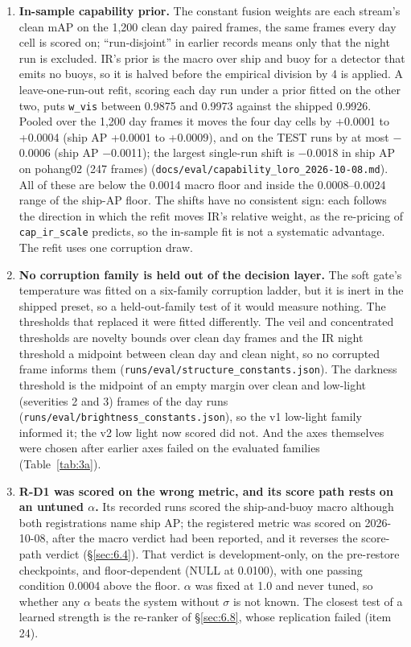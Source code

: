\documentclass[10pt]{article}
\begin{document}
\begin{enumerate}
\item \textbf{In-sample capability prior.} The constant fusion weights are each stream's clean mAP on the 1,200 clean day paired frames, the same frames every day cell is scored on; ``run-disjoint'' in earlier records means only that the night run is excluded. IR's prior is the macro over ship and buoy for a detector that emits no buoys, so it is halved before the empirical division by 4 is applied. A leave-one-run-out refit, scoring each day run under a prior fitted on the other two, puts \texttt{w\_\allowbreak{}vis} between 0.9875 and 0.9973 against the shipped 0.9926. Pooled over the 1,200 day frames it moves the four day cells by +0.0001 to +0.0004 (ship AP +0.0001 to +0.0009), and on the TEST runs by at most $-$0.0006 (ship AP $-$0.0011); the largest single-run shift is $-$0.0018 in ship AP on pohang02 (247 frames) (\texttt{docs/\allowbreak{}eval/\allowbreak{}capability\_\allowbreak{}loro\_\allowbreak{}2026-10-08.md}). All of these are below the 0.0014 macro floor and inside the 0.0008--0.0024 range of the ship-AP floor. The shifts have no consistent sign: each follows the direction in which the refit moves IR's relative weight, as the re-pricing of \texttt{cap\_\allowbreak{}ir\_\allowbreak{}scale} predicts, so the in-sample fit is not a systematic advantage. The refit uses one corruption draw.
\item \textbf{No corruption family is held out of the decision layer.} The soft gate's temperature was fitted on a six-family corruption ladder, but it is inert in the shipped preset, so a held-out-family test of it would measure nothing. The thresholds that replaced it were fitted differently. The veil and concentrated thresholds are novelty bounds over clean day frames and the IR night threshold a midpoint between clean day and clean night, so no corrupted frame informs them (\texttt{runs/\allowbreak{}eval/\allowbreak{}structure\_\allowbreak{}constants.json}). The darkness threshold is the midpoint of an empty margin over clean and low-light (severities 2 and 3) frames of the day runs (\texttt{runs/\allowbreak{}eval/\allowbreak{}brightness\_\allowbreak{}constants.json}), so the v1 low-light family informed it; the v2 low light now scored did not. And the axes themselves were chosen after earlier axes failed on the evaluated families (Table~\ref{tab:3a}).
\item \textbf{R-D1 was scored on the wrong metric, and its score path rests on an untuned $\alpha$.} Its recorded runs scored the ship-and-buoy macro although both registrations name ship AP; the registered metric was scored on 2026-10-08, after the macro verdict had been reported, and it reverses the score-path verdict (\S\ref{sec:6.4}). That verdict is development-only, on the pre-restore checkpoints, and floor-dependent (NULL at 0.0100), with one passing condition 0.0004 above the floor. $\alpha$ was fixed at 1.0 and never tuned, so whether any $\alpha$ beats the system without $\sigma$ is not known. The closest test of a learned strength is the re-ranker of \S\ref{sec:6.8}, whose replication failed (item 24).

\end{enumerate}
\end{document}
